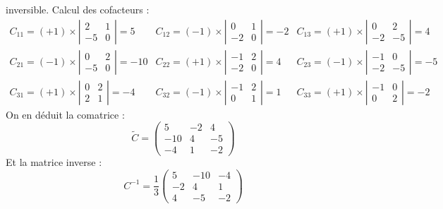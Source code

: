 {inversible.
Calcul des cofacteurs :
$$
\begin{array}{lll}
	C_{11}=(+1) \times\left|\begin{array}{cc}
		2 & 1 \\
		-5 & 0
	\end{array}\right|=5 & C_{12}=(-1) \times\left|\begin{array}{cc}
		0 & 1 \\
		-2 & 0
	\end{array}\right|=-2 & C_{13}=(+1) \times\left|\begin{array}{cc}
		0 & 2 \\
		-2 & -5
	\end{array}\right|=4 \\
	C_{21}=(-1) \times\left|\begin{array}{cc}
		0 & 2 \\
		-5 & 0
	\end{array}\right|=-10 & C_{22}=(+1) \times\left|\begin{array}{cc}
		-1 & 2 \\
		-2 & 0
	\end{array}\right|=4 & C_{23}=(-1) \times\left|\begin{array}{cc}
		-1 & 0 \\
		-2 & -5
	\end{array}\right|=-5 \\
	C_{31}=(+1) \times\left|\begin{array}{cc}
		0 & 2 \\
		2 & 1
	\end{array}\right|=-4 & C_{32}=(-1) \times\left|\begin{array}{cc}
		-1 & 2 \\
		0 & 1
	\end{array}\right|=1 & C_{33}=(+1) \times\left|\begin{array}{cc}
		-1 & 0 \\
		0 & 2
	\end{array}\right|=-2
\end{array}
$$
On en déduit la comatrice :
$$
\tilde{C}=\left(\begin{array}{ccc}
	5 & -2 & 4 \\
	-10 & 4 & -5 \\
	-4 & 1 & -2
\end{array}\right)
$$
Et la matrice inverse :
$$
C^{-1}=\frac{1}{3}\left(\begin{array}{ccc}
	5 & -10 & -4 \\
	-2 & 4 & 1 \\
	4 & -5 & -2
\end{array}\right)
$$ }
